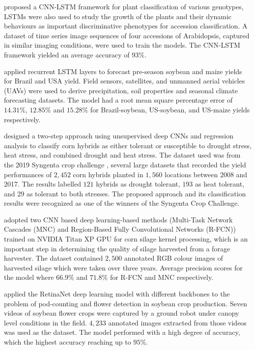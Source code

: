 \documentclass[12pt]{report}
\numberwithin{equation}{section}
\begin{document}
{\cite{taghavi:18}} proposed a CNN-LSTM framework for plant classification of various genotypes, LSTMs were also used to study the growth of the plants and their dynamic behaviours as important discriminative phenotypes for accession classification. A dataset of time series image sequences of four accessions of {Arabidopsis}, captured in similar imaging conditions, were used to train the models. The CNN-LSTM framework yielded an average accuracy of $93\%$.

{\cite{oliveira2018scalable}} applied recurrent LSTM layers to forecast pre-season soybean and maize yields for Brazil and USA yield. Field sensors, satellites, and unmanned aerial vehicles (UAVs) were used to derive precipitation, soil properties and seasonal climate forecasting datasets. The model had a root mean square percentage error of $14.31\%$, $12.85\%$ and  $15.28\%$ for Brazil-soybean, US-soybean, and  US-maize yields respectively. 

{\cite{agronomy9120833}} designed a two-step approach using unsupervised  deep CNNs and regression analysis to classify corn hybrids as either tolerant or susceptible to drought stress, heat stress, and combined drought and heat stress. The dataset used was from the 2019 Syngenta crop challenge {\cite{syngenta}}, several large datasets that recorded the yield performances of $2,452$ corn hybrids planted in $1,560$ locations between 2008 and 2017. The results labelled $121$ hybrids as drought tolerant, $193$ as heat tolerant, and $29$ as tolerant to both stresses. The proposed approach and its classification results were recognized as one of the winners of the Syngenta Crop Challenge.

{\cite{rasmussen2019maize}} adopted two CNN based deep learning-based methods (Multi-Task Network Cascades (MNC) and Region-Based Fully Convolutional Networks (R-FCN)) trained on NVIDIA Titan XP GPU  for corn silage kernel processing, which is an important step in determining the quality of silage harvested from a forage harvester. The dataset contained $2,500$ annotated RGB colour images of harvested silage which were taken over three years. Average precision scores for the model where $66.9\%$ and $71.8\%$ for R-FCN and MNC respectively.

{\cite{zhang2019deep}} applied the RetinaNet deep learning model {\cite{lin2017focal}} with different backbones to the problem of pod-counting and  flower detection in soybean crop production. Seven videos of soybean flower crops were captured by a ground robot under canopy level conditions in the field. $4,233$ annotated images extracted from those videos was used as the dataset. The model performed with a high degree of accuracy, which the highest accuracy reaching up to $95\%$.
\end{document}
